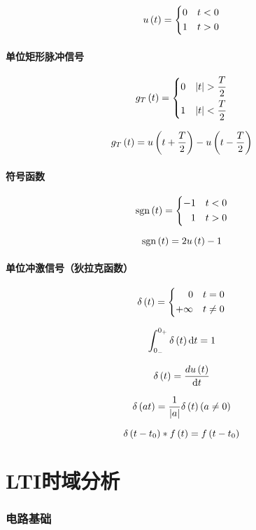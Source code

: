 \documentclass{article}
\begin{document}
\[u\left(t\right)=
    \left\{\begin{aligned}
        0 &  & t<0 \\
        1 &  & t>0
    \end{aligned}\right.\]

\subsection{单位矩形脉冲信号}

\[g_T\pare{t}=
    \left\{\begin{aligned}
        0 &  & \abs{t}>\frac T2 \\
        1 &  & \abs{t}<\frac T2
    \end{aligned}\right.\]

\[g_T\left(t\right)=u\left(t+\frac T2\right)-u\left(t-\frac T2\right)\]

\subsection{符号函数}

\[\mathrm{sgn}\left(t\right)=
    \left\{\begin{aligned}
        -1 &  & t<0 \\
        1  &  & t>0
    \end{aligned}\right.\]

\[\mathrm{sgn}\left(t\right)=2u\left(t\right)-1\]

\subsection{单位冲激信号（狄拉克函数）}

\[\delta\left(t\right)=
    \left\{\begin{aligned}
        0       &  & t=0    \\
        +\infty &  & t\neq0
    \end{aligned}\right.\]

\[\int_{0_-}^{0_+}\delta\left(t\right)\mathrm d t=1\]

\[\delta\left(t\right)=\frac{d u\left(t\right)}{\mathrm d t}\]

\[\delta\left(at\right)=\frac1{\left|a\right|}\delta\left(t\right)\left(a\neq0\right)\]

\[\delta\left(t-t_0\right)\ast f\left(t\right)=f\left(t-t_0\right)\]

\part{LTI时域分析}

\section{电路基础}
\end{document}
